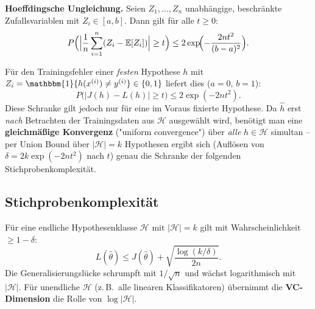\documentclass[11pt]{article}
\theoremstyle{csthm}
\theoremstyle{csdef}
\newcommand{\E}{\mathbb{E}}
\newcommand{\I}{\mathbbm{1}}
\begin{document}
\begin{tcolorbox}[thmstyle]
\textbf{Hoeffdingsche Ungleichung.} Seien $Z_1,\ldots,Z_n$ unabhängige,
beschränkte Zufallsvariablen mit $Z_i \in [a,b]$. Dann gilt für alle
$t\geq 0$:
\begin{equation}
  P\Bigl(\Bigl|\frac1n\sum_{i=1}^n (Z_i - \E[Z_i])\Bigr| \geq t\Bigr)
  \leq 2\exp\!\Bigl(-\frac{2nt^2}{(b-a)^2}\Bigr).
\end{equation}
\end{tcolorbox}

Für den Trainingsfehler einer \emph{festen} Hypothese $h$ mit
$Z_i = \I\{h(x^{(i)}) \neq y^{(i)}\} \in \{0,1\}$ liefert dies ($a=0,\,b=1$):
\begin{equation}
  P\bigl(|J(h) - L(h)| \geq t\bigr) \leq 2\exp(-2nt^2).
\end{equation}
Diese Schranke gilt jedoch nur für eine im Voraus fixierte Hypothese. Da
$\hat h$ erst \emph{nach} Betrachten der Trainingsdaten aus $\mathcal H$
ausgewählt wird, benötigt man eine \textbf{gleichmäßige Konvergenz}
("uniform convergence") über \emph{alle} $h\in\mathcal H$ simultan -- per
Union Bound über $|\mathcal H|=k$ Hypothesen ergibt sich (Auflösen von
$\delta = 2k\exp(-2nt^2)$ nach $t$) genau die Schranke der folgenden
Stichprobenkomplexität.

\subsection{Stichprobenkomplexität}

Für eine endliche Hypothesenklasse $\mathcal{H}$ mit $|\mathcal{H}| = k$
gilt mit Wahrscheinlichkeit $\geq 1-\delta$:
\begin{equation}
  L(\hat\theta) \leq J(\hat\theta) + \sqrt{\frac{\log(k/\delta)}{2n}}.
\end{equation}
Die Generalisierungslücke schrumpft mit $1/\sqrt{n}$ und wächst logarithmisch
mit $|\mathcal{H}|$. Für unendliche $\mathcal{H}$ (z.\,B.\ alle linearen
Klassifikatoren) übernimmt die \textbf{VC-Dimension} die Rolle von
$\log |\mathcal H|$.
\end{document}
